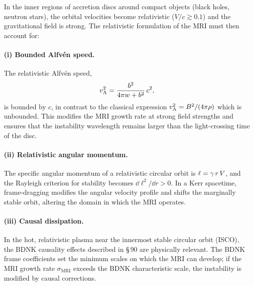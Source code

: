 In the inner regions of accretion discs around compact objects
(black holes, neutron stars), the orbital velocities become
relativistic ($V/c \gtrsim 0.1$) and the gravitational field is
strong.  The relativistic formulation of the MRI must then account
for:

\paragraph{(i) Bounded Alfv\'en speed.}
The relativistic Alfv\'en speed,
\begin{equation}\label{eq:rel-9-vA-rel}
  v_{\mathrm{A}}^{2} = \frac{b^{2}}{4\pi w + b^{2}}\,c^{2},
\end{equation}
is bounded by $c$, in contrast to the classical expression
$v_{\mathrm{A}}^{2} = B^{2}/(4\pi\rho)$ which is unbounded.  This modifies the
MRI growth rate at strong field strengths and ensures that the
instability wavelength remains larger than the light-crossing
time of the disc.

\paragraph{(ii) Relativistic angular momentum.}
The specific angular momentum of a relativistic circular orbit is
$\ell = \gamma\,r\,V$, and the Rayleigh criterion for stability becomes
$\dd\ell^{2}/\dd r > 0$.  In a Kerr spacetime, frame-dragging
modifies the angular velocity profile and shifts the marginally
stable orbit, altering the domain in which the MRI operates.

\paragraph{(iii) Causal dissipation.}
In the hot, relativistic plasma near the innermost stable circular
orbit (ISCO), the BDNK causality effects described in
\S\,90 are physically relevant.  The BDNK frame
coefficients set the minimum scales on which the
MRI can develop; if the MRI growth rate $\sigma_{\mathrm{MRI}}$
exceeds the BDNK characteristic scale, the instability is modified by causal
corrections.

